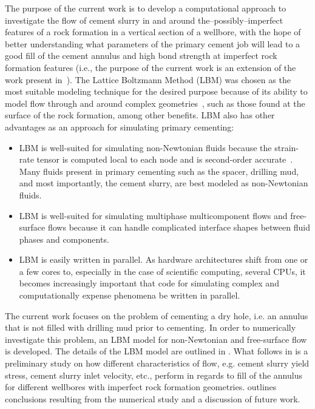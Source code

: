 \documentclass[pdftex,ms]{pittetd}
\begin{document}
The purpose of the current work is to develop a computational approach to investigate the flow of cement slurry in and around the--possibly--imperfect features of a rock formation in a vertical section of a wellbore, with the hope of better understanding what parameters of the primary cement job will lead to a good fill of the cement annulus and high bond strength at imperfect rock formation features (i.e., the purpose of the current work is an extension of the work present in~\citet{grasinger2015simulation}).
The Lattice Boltzmann Method (LBM) was chosen as the most suitable modeling technique for the desired purpose because of its ability to model flow through and around complex geometries~\cite{thorne2006lattice}, such as those found at the surface of the rock formation, among other benefits.
LBM also has other advantages as an approach for simulating primary cementing:
\begin{itemize}
\item LBM is well-suited for simulating non-Newtonian fluids because the strain-rate tensor is computed local to each node and is second-order accurate~\cite{kruger2009shear,kruger2010second}.
Many fluids present in primary cementing such as the spacer, drilling mud, and most importantly, the cement slurry, are best modeled as non-Newtonian fluids.
\item LBM is well-suited for simulating multiphase multicomponent flows and free-surface flows because it can handle complicated interface shapes between fluid phases and components.
\item LBM is easily written in parallel.
As hardware architectures shift from one or a few cores to, especially in the case of scientific computing, several CPUs, it becomes increasingly important that code for simulating complex and computationally expense phenomena be written in parallel.
\end{itemize}
The current work focuses on the problem of cementing a dry hole, i.e. an annulus that is not filled with drilling mud prior to cementing.
In order to numerically investigate this problem, an LBM model for non-Newtonian and free-surface flow is developed.
The details of the LBM model are outlined in .
What follows in  is a preliminary study on how different characteristics of flow, e.g. cement slurry yield stress, cement slurry inlet velocity, etc., perform in regards to fill of the annulus for different wellbores with imperfect rock formation geometries.
 outlines conclusions resulting from the numerical study and a discussion of future work.
\end{document}
